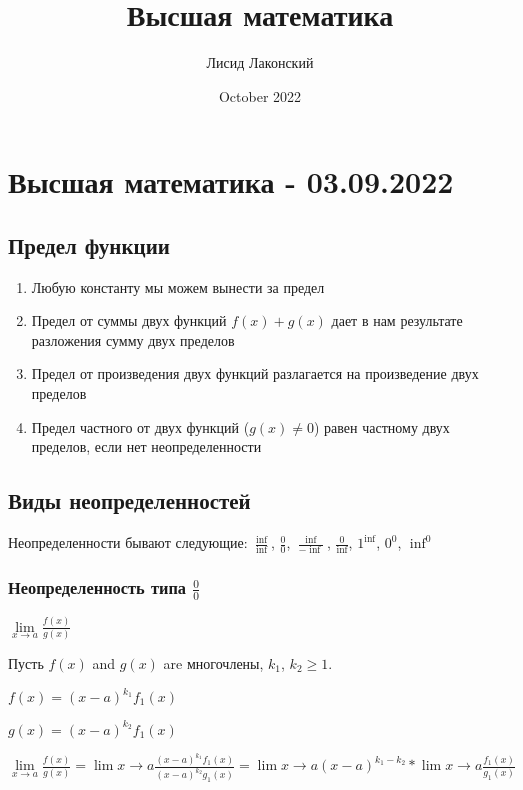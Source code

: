 \documentclass{article}
\title{Высшая математика}
\author{Лисид Лаконский}
\date{October 2022}
\begin{document}
\maketitle

\tableofcontents
\pagebreak

\section{Высшая математика - 03.09.2022}

\subsection{Предел функции}

\begin{enumerate}
    \item Любую константу мы можем вынести за предел
    \item Предел от суммы двух функций $f(x) + g(x)$ дает в нам результате разложения сумму двух пределов
    \item Предел от произведения двух функций разлагается на произведение двух пределов
    \item Предел частного от двух функций ($g(x) \ne 0$) равен частному двух пределов, если нет неопределенности
\end{enumerate}

\subsection{Виды неопределенностей}

Неопределенности бывают следующие: $\frac{\inf}{\inf}$, $\frac{0}{0}$, $\frac{\inf}{-\inf}$, $\frac{0}{\inf}$, $1^{\inf}$, $0^{0}$, $\inf^{0}$

\subsubsection{Неопределенность типа $\frac{0}{0}$}

$\lim\limits_{x \to a} \frac{f(x)}{g(x)}$

Пусть $f(x)$ and $g(x)$ are многочлены, $k_1$, $k_2 \ge 1$.

$f(x) = (x - a)^{k_1} f_{1}(x)$

$g(x) = (x-a)^{k_2} f_{1}(x)$

$\lim\limits_{x \to a} \frac{f(x)}{g(x)} = \lim{x \to a} \frac{(x- a)^{k_1} f_{1}(x)}{(x-a)^{k_2}g_{1}(x)} = \lim{x \to a} (x - a)^{k_1 - k_2} * \lim{x \to a} \frac{f_{1}(x)}{g_{1}(x)}$
\end{document}
